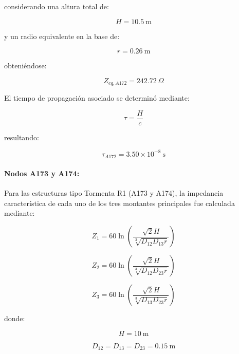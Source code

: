 \documentclass[12pt,letterpaper]{article}
\begin{document}
considerando una altura total de:

\begin{equation*}
H=10.5\ \mathrm{m}
\end{equation*}

y un radio equivalente en la base de:

\begin{equation*}
r=0.26\ \mathrm{m}
\end{equation*}

obteniéndose:

\begin{equation*}
Z_{eq,A172}=242.72\ \Omega
\end{equation*}

El tiempo de propagación asociado se determinó mediante:

\begin{equation*}
\tau=\frac{H}{c}
\end{equation*}

resultando:

\begin{equation*}
\tau_{A172}=3.50\times10^{-8}\ \mathrm{s}
\end{equation*}


\paragraph{Nodos A173 y A174:}

Para las estructuras tipo Tormenta R1 (A173 y A174), la impedancia característica de cada uno de los tres montantes principales fue calculada mediante:

\begin{equation}
Z_1=
60\ln
\left(
\frac{\sqrt{2}H}
{\sqrt[3]{D_{12}D_{13}r}}
\right)
\end{equation}

\begin{equation}
Z_2=
60\ln
\left(
\frac{\sqrt{2}H}
{\sqrt[3]{D_{12}D_{23}r}}
\right)
\end{equation}

\begin{equation}
Z_3=
60\ln
\left(
\frac{\sqrt{2}H}
{\sqrt[3]{D_{13}D_{23}r}}
\right)
\end{equation}

donde:

\begin{equation*}
H=10\ \mathrm{m}
\end{equation*}

\begin{equation*}
D_{12}=D_{13}=D_{23}=0.15\ \mathrm{m}
\end{equation*}
\end{document}
